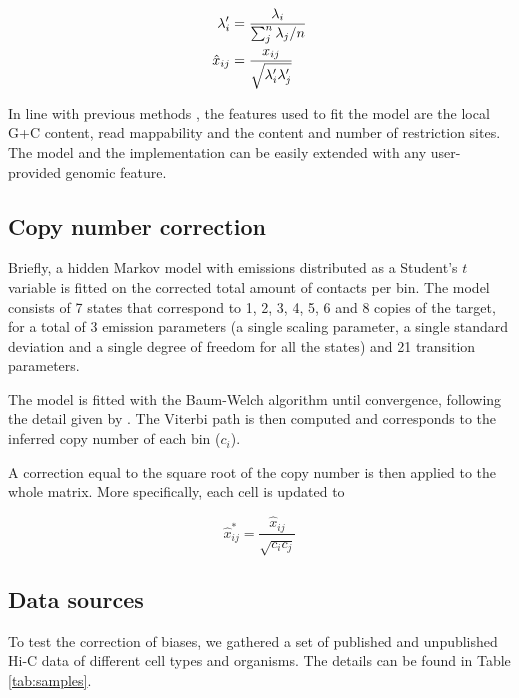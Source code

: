 \documentclass{bioinfo}
\begin{document}
\begin{methods}
\begin{align}
\notag
\lambda_i' &= \frac{\lambda_i}{\sum_j^n{\lambda_j}/n} \\
\label{eq:xhat}
\hat{x}_{ij} &= \frac{x_{ij}}{\sqrt{\lambda_i'\lambda_j'}}
\end{align}

In line with previous methods
\citep{yaffe2011probabilistic,hu2012hicnorm}, the features
used to fit the model are the local G+C content, read mappability and the 
content and number of restriction sites. The model and the implementation
can be easily extended with any user-provided genomic feature.

\subsection{Copy number correction}

Briefly, a hidden Markov model with emissions distributed as a Student's
$t$ variable is fitted on the corrected total amount of contacts per bin.
The model consists of 7 states that correspond to 1, 2, 3, 4, 5, 6 and 8
copies of the target, for a total of 3 emission parameters (a single
scaling parameter, a single standard deviation and a single degree of
freedom for all the states) and 21 transition parameters. 

The model is fitted with the Baum-Welch algorithm \citep{baum1966} until
convergence, following the detail given by \cite{filion2010systematic}.
The Viterbi path is then computed and corresponds to the inferred copy
number of each bin ($c_i$).

A correction equal to the square root of the copy number is then applied
to the whole matrix. More specifically, each cell is updated to


\begin{equation}
\label{eq:cnvnorm}
\hat{x}_{ij}^* = \frac{\hat{x}_{ij}}{\sqrt{c_ic_j}}
\end{equation}

\subsection{Data sources}

To test the correction of biases, we gathered a set of
published \citep{ledily2014distinct, encode2012integrated, rao20143d,
stadhouders2017transcription, lin2012global, dixon2012topological} and
unpublished Hi-C data of different cell types and organisms. The details
can be found in Table \ref{tab:samples}.


\end{methods}
\end{document}
